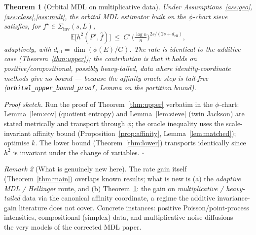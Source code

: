 \documentclass[11pt]{article}
\theoremstyle{plain}
\newtheorem{theorem}{Theorem}[section]
\theoremstyle{definition}
\theoremstyle{remark}
\newtheorem{remark}[theorem]{Remark}
\newcommand{\E}{\mathbb{E}}
\DeclareMathOperator{\dimm}{dim}
\begin{document}
\begin{theorem}[Orbital MDL on multiplicative data]\label{thm:mult}
Under Assumptions~\ref{ass:geo},\ref{ass:class},\ref{ass:mult}, the orbital MDL
estimator built on the $\phi$-chart sieve satisfies, for
$f^\star\in\Sigma_{\mathrm{inv}}(s,L)$,
\[
\E\big[h^2(P^\star,\widehat f)\big]\ \le\ C'\,\Big(\tfrac{\log n}{n}\Big)^{2s/(2s+d_{\mathrm{eff}})},
\]
adaptively, with $d_{\mathrm{eff}}=\dimm(\phi(E)/G)$. The rate is identical to the
additive case (Theorem~\ref{thm:upper}); the contribution is that it holds on
positive/compositional, possibly heavy-tailed, data where identity-coordinate
methods give no bound --- because the affinity oracle step is tail-free
(\texttt{orbital\_upper\_bound\_proof}, Lemma on the partition bound).
\end{theorem}

\noindent\emph{Proof sketch.} Run the proof of Theorem~\ref{thm:upper} verbatim
in the $\phi$-chart: Lemma~\ref{lem:cov} (quotient entropy) and
Lemma~\ref{lem:sieve} (twin Jackson) are stated metrically and transport through
$\phi$; the oracle inequality uses the scale-invariant affinity bound
(Proposition~\ref{prop:affinity}, Lemma~\ref{lem:matched}); optimise $k$. The
lower bound (Theorem~\ref{thm:lower}) transports identically since $h^2$ is
invariant under the change of variables. \hfill$\square$

\begin{remark}[What is genuinely new here]
The rate gain itself (Theorem~\ref{thm:main}) overlaps known results; what is new
is (a) the \emph{adaptive MDL / Hellinger} route, and (b)
Theorem~\ref{thm:mult}: the gain on \emph{multiplicative / heavy-tailed} data via
the canonical affinity coordinate, a regime the additive invariance-gain
literature does not cover. Concrete instances: positive Poisson/point-process
intensities, compositional (simplex) data, and multiplicative-noise diffusions
--- the very models of the corrected MDL paper.
\end{remark}
\end{document}
